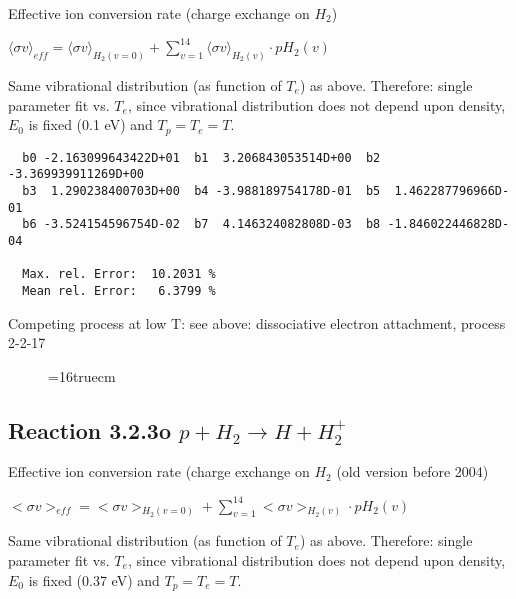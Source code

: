 \documentclass[12pt,dvipdfmx]{article}
\begin{document}
  Effective ion conversion rate (charge exchange on $H_2$)

  $ \langle\sigma v \rangle_{eff} = \langle\sigma v \rangle_{H_2(v=0)} + \sum_{v=1}^{14}
\langle\sigma v \rangle_{H_2(v)} \cdot pH_2(v) $

  Same vibrational distribution (as function of $T_e$) as above.
  Therefore:
  single parameter fit vs. $T_e$,
  since vibrational distribution does not depend upon density, $E_0$ is fixed
  (0.1 eV) and $T_p = T_e = T$.

\begin{small}\begin{verbatim}
  b0 -2.163099643422D+01  b1  3.206843053514D+00  b2 -3.369939911269D+00
  b3  1.290238400703D+00  b4 -3.988189754178D-01  b5  1.462287796966D-01
  b6 -3.524154596754D-02  b7  4.146324082808D-03  b8 -1.846022446828D-04

  Max. rel. Error:  10.2031 %
  Mean rel. Error:   6.3799 %

\end{verbatim}\end{small}
Competing process at low T: see above: dissociative electron attachment, process 2-2-17
\begin{figure} \label{3.2.3}
\epsfxsize=16truecm
\end{figure}

\newpage

\subsection{
Reaction 3.2.3o   $p + H_2 \rightarrow H + H_2^+  $}

  Effective ion conversion rate (charge exchange on $H_2$ (old version before 2004)

  $ <\sigma v>_{eff} = <\sigma v>_{H_2(v=0)} + \sum_{v=1}^{14}
<\sigma v>_{H_2(v)} \cdot pH_2(v) $

  Same vibrational distribution (as function of $T_e$) as above.
  Therefore:
  single parameter fit vs. $T_e$,
  since vibrational distribution does not depend upon density, $E_0$ is fixed
  (0.37 eV) and $T_p = T_e = T$.
\end{document}
